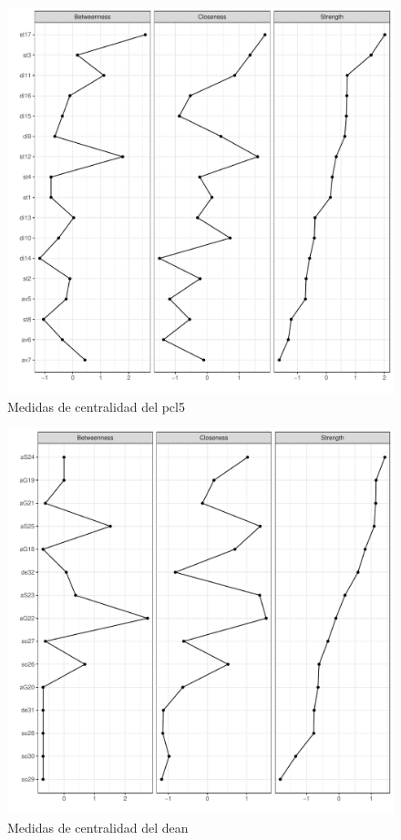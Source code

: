 \documentclass[11pt,spanish]{article}\usepackage[]{graphicx}\usepackage[]{color}
\begin{document}
\begin{figure}[ht]
\centering
\includegraphics[scale=0.7]{images/centrality_net_pcl5.pdf}
\caption{Medidas de centralidad del pcl5}
\label{fig:centra_pcl5}
\end{figure}

\begin{figure}[ht]
\centering
\includegraphics[scale=0.7]{images/centrality_net_dean.pdf}
\caption{Medidas de centralidad del dean}
\label{fig:centra_dean}
\end{figure}
\end{document}
